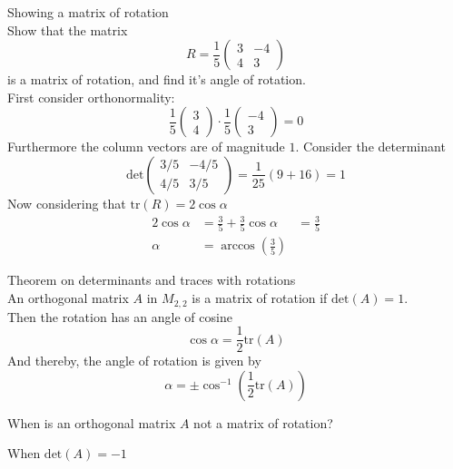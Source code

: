\documentclass[journal, letterpaper]{IEEEtran}
\begin{document}
    \begin{myboxg}{Showing a matrix of rotation} \\ 
        Show that the matrix
        $$ R = \frac{1}{5}\begin{pmatrix}
            3 & -4 \\ 4 & 3
        \end{pmatrix}$$
        is a matrix of rotation, and find it's angle of rotation. \\ 

        First consider orthonormality:
        $$
        \frac{1}{5}\begin{pmatrix}
            3 \\ 4
        \end{pmatrix} \cdot \frac{1}{5} \begin{pmatrix}
            -4 \\ 3
        \end{pmatrix} = 0
        $$
        Furthermore the column vectors are of magnitude $1$. Consider the determinant
        $$
            \text{det}\begin{pmatrix}
                3/5 & -4/5 \\ 4/5 & 3/5 
            \end{pmatrix} = \frac{1}{25}(9 + 16) = 1
        $$
        Now considering that $\text{tr}(R) = 2\cos\alpha$
        \begin{align*}
            2\cos\alpha &= \frac{3}{5} + \frac{3}{5}
            \cos\alpha &= \frac{3}{5} \\ 
            \alpha &= \arccos\left(\frac{3}{5}\right)
        \end{align*}
    \end{myboxg}
    \begin{myboxr}{Theorem on determinants and traces with rotations} \\ 
        An orthogonal matrix $A$ in $M_{2, 2}$ is a matrix of rotation if $\text{det}(A) = 1$. 
        \newline \\ 
        Then the rotation has an angle of cosine
        $$\cos\alpha = \frac{1}{2}\text{tr}(A) $$
        And thereby, the angle of rotation is given by
        $$ \alpha = \pm \cos^{-1}\left(\frac{1}{2}\text{tr}(A) \right)$$
    \end{myboxr}
    When is an orthogonal matrix $A$ not a matrix of rotation?
    \begin{center}
        When $\text{det}(A) = -1$
    \end{center}
\end{document}
